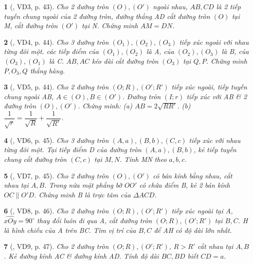 \documentclass{article}
\newtheorem{baitoan}{}
\begin{document}
\begin{baitoan}[\cite{TLCT_THCS_Toan_9_hinh_hoc}, VD3, p. 43]
	Cho 2 đường tròn $(O),(O')$ ngoài nhau, $AB,CD$ là 2 tiếp tuyến chung ngoài của 2 đường tròn, đường thẳng AD cắt đường tròn $(O)$ tại M, cắt đường tròn $(O')$ tại N. Chứng minh $AM = DN$.
\end{baitoan}

\begin{baitoan}[\cite{TLCT_THCS_Toan_9_hinh_hoc}, VD4, p. 44]
	Cho 3 đường tròn $(O_1),(O_2),(O_3)$ tiếp xúc ngoài với nhau từng đôi một. các tiếp điểm của $(O_1),(O_2)$ là A, của $(O_2),(O_3)$ là B, của $(O_3),(O_1)$ là C. $AB,AC$ kéo dài cắt đường tròn $(O_3)$ tại $Q,P$. Chứng minh $P,O_3,Q$ thẳng hàng.
\end{baitoan}

\begin{baitoan}[\cite{TLCT_THCS_Toan_9_hinh_hoc}, VD5, p. 44]
	Cho 2 đường tròn $(O;R),(O';R')$ tiếp xúc ngoài, tiếp tuyến chung ngoài AB, $A\in(O),B\in(O')$. Đường tròn $(I;r)$ tiếp xúc với AB \& 2 đường tròn $(O),(O')$. Chứng minh: (a) $AB = 2\sqrt{RR'}$. (b) $\dfrac{1}{\sqrt{r}} = \dfrac{1}{\sqrt{R}} + \dfrac{1}{\sqrt{R'}}$.
\end{baitoan}

\begin{baitoan}[\cite{TLCT_THCS_Toan_9_hinh_hoc}, VD6, p. 45]
	Cho 3 đường tròn $(A,a),(B,b),(C,c)$ tiếp xúc với nhau từng đôi một. Tại tiếp điểm D của đường tròn $(A,a),(B,b)$, kẻ tiếp tuyến chung cắt đường tròn $(C,c)$ tại $M,N$. Tính MN theo $a,b,c$.
\end{baitoan}

\begin{baitoan}[\cite{TLCT_THCS_Toan_9_hinh_hoc}, VD7, p. 45]
	Cho 2 đường tròn $(O),(O')$ có bán kính bằng nhau, cắt nhau tại $A,B$. Trong nửa mặt phẳng bờ $OO'$ có chứa điểm B, kẻ 2 bán kính $OC\parallel O'D$. Chứng minh B là trực tâm của $\Delta ACD$.
\end{baitoan}

\begin{baitoan}[\cite{TLCT_THCS_Toan_9_hinh_hoc}, VD8, p. 46]
	Cho 2 đường tròn $(O;R),(O';R')$ tiếp xúc ngoài tại A, $\widehat{xOy} = 90^\circ$  thay đổi luôn đi qua A, cắt đường tròn $(O;R),(O';R')$ tại $B,C$. H là hình chiếu của A trên BC. Tìm vị trí của $B,C$ để AH có độ dài lớn nhất.
\end{baitoan}

\begin{baitoan}[\cite{TLCT_THCS_Toan_9_hinh_hoc}, VD9, p. 47]
	Cho 2 đường tròn $(O;R),(O';R')$, $R > R'$ cắt nhau tại $A,B$. Kẻ đường kính AC \& đường kính AD. Tính độ dài $BC,BD$ biết $CD = a$.
\end{baitoan}
\end{document}
